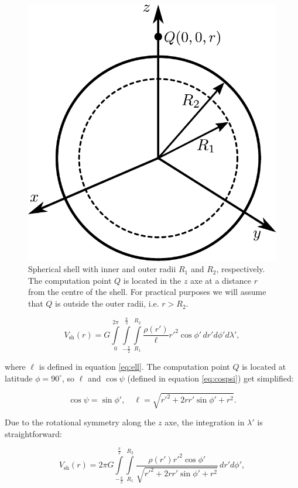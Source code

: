 \documentclass[extra]{gji}
\begin{document}
\begin{figure}
\centering
\includegraphics[width=0.7\linewidth]{figures/spherical-shell.pdf}
\caption{
Spherical shell with inner and outer radii $R_1$ and $R_2$, respectively.
The computation point $Q$ is located in the $z$ axe at a distance $r$ from the centre of the shell.
For practical purposes we will assume that $Q$ is outside the outer radii, i.e. $r > R_2$.
}
\label{fig:spherical-shell}
\end{figure}

\begin{equation}
    V_\text{sh}(r) = G 
    \int\limits_0^{2\pi}
    \int\limits_{-\frac{\pi}{2}}^\frac{\pi}{2}
    \int\limits_{R_1}^{R_2}
    \frac{\rho(r')}{\ell} {r'}^2 \cos\phi' \, 
    dr' d\phi' d\lambda',
\end{equation}

\noindent where $\ell$ is defined in equation \ref{eq:ell}.
The computation point $Q$ is located at latitude $\phi=90^\circ$, so $\ell$ and $\cos\psi$ (defined in equation \ref{eq:cospsi}) get simplified:

\begin{equation}
    \cos\psi = \sin\phi', \quad
    \ell = \sqrt{r'^2 + 2 r r' \sin\phi' + r^2}.
\end{equation}

Due to the rotational symmetry along the $z$ axe, the integration in $\lambda'$ is straightforward:

\begin{equation}
    V_\text{sh}(r) = 2\pi G 
    \int\limits_{-\frac{\pi}{2}}^\frac{\pi}{2}
    \int\limits_{R_1}^{R_2}
    \frac{\rho(r') {r'}^2 \cos\phi'}{\sqrt{r'^2 + 2 r r' \sin\phi' + r^2}}
    \, dr' d\phi',
\end{equation}
\end{document}
